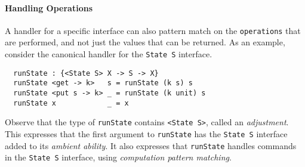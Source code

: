 \documentclass[msc,deptreport,cs]{infthesis} %
\newcommand{\code}[1]{\lstinline{#1}}
\begin{document}
\paragraph*{Handling Operations}


A handler for a specific interface can also pattern match on the
\code{operations} that are performed, and not just the values that can be
returned. As an example, consider the canonical handler for the \code{State S}
interface.

\begin{lstlisting}
  runState : {<State S> X -> S -> X}
  runState <get -> k>   s = runState (k s) s
  runState <put s -> k> _ = runState (k unit) s
  runState x            _ = x
\end{lstlisting}


\noindent Observe that the type of \code{runState} contains \code{<State S>},
called an \emph{adjustment}. This expresses that the first argument to
\code{runState} has the \code{State S} interface added to its \emph{ambient
  ability}. It also expresses that \code{runState} handles commands in the
\code{State S} interface, using \emph{computation pattern matching}.
\end{document}

